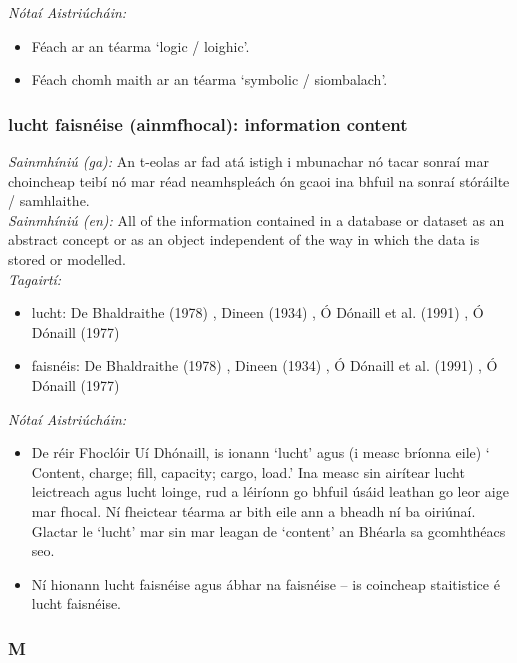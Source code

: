  \noindent \textit{Nótaí Aistriúcháin:}
\begin{itemize}
	\item Féach ar an téarma `logic / loighic'.
	\item Féach chomh maith ar an téarma `symbolic / siombalach'.
\end{itemize}


\subsubsection*{lucht faisnéise (ainmfhocal): information content}
 \noindent \textit{Sainmhíniú (ga):} An t-eolas ar fad atá istigh i mbunachar nó tacar sonraí mar choincheap teibí nó mar réad neamhspleách ón gcaoi ina bhfuil na sonraí stóráilte / samhlaithe.
\\
 \noindent \textit{Sainmhíniú (en):} All of the information contained in a database or dataset as an abstract concept or as an object independent of the way in which the data is stored or modelled.
\\
 \noindent \textit{Tagairtí:}
\begin{itemize}
	\item lucht: De Bhaldraithe (1978) \cite{de-bhaldraithe}, Dineen (1934) \cite{dineen}, Ó Dónaill et al. (1991) \cite{focloir-beag}, Ó Dónaill (1977) \cite{odonaill}
	\item faisnéis: De Bhaldraithe (1978) \cite{de-bhaldraithe}, Dineen (1934) \cite{dineen}, Ó Dónaill et al. (1991) \cite{focloir-beag}, Ó Dónaill (1977) \cite{odonaill}
\end{itemize}

 \noindent \textit{Nótaí Aistriúcháin:}
\begin{itemize}
	\item De réir Fhoclóir Uí Dhónaill, is ionann `lucht' agus (i measc bríonna eile) ` Content, charge; fill, capacity; cargo, load.' Ina measc sin airítear lucht leictreach agus lucht loinge, rud a léiríonn go bhfuil úsáid leathan go leor aige mar fhocal. Ní fheictear téarma ar bith eile ann a bheadh ní ba oiriúnaí. Glactar le `lucht' mar sin mar leagan de `content' an Bhéarla sa gcomhthéacs seo.
	\item Ní hionann lucht faisnéise agus ábhar na faisnéise -- is coincheap staitistice é lucht faisnéise.
\end{itemize}


 \subsubsection*{M}

